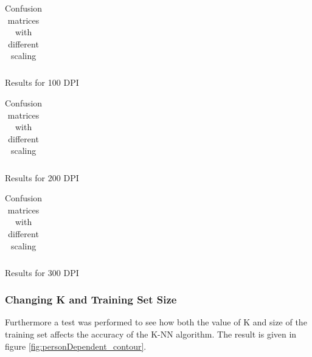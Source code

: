 \begin{table}
    \centering
    \begin{subtable}{0.5\textwidth}
        \flushright
    \end{subtable}

    \begin{subtable}{0.1\textwidth}
        \flushright
    \end{subtable}
    \begin{subtable}{0.6\textwidth}
        \begin{subtable}{\textwidth}
            \centering
            {\tiny
                \begin{tabular}{l|*{10}{c}}
                    
                \end{tabular}
            }
            \caption{Results for 100 DPI}
        \end{subtable}
        \begin{subtable}{\textwidth}
            \centering
            {\tiny
                \begin{tabular}{l|*{10}{c}}
                    
                \end{tabular}
            }
            \caption{Results for 200 DPI}
        \end{subtable}
        \begin{subtable}{\textwidth}
            \centering
            {\tiny
                \begin{tabular}{l|*{10}{c}}
                    
                \end{tabular}
            }
            \caption{Results for 300 DPI}
        \end{subtable}
    \end{subtable}
    \caption{Confusion matrices with different scaling}
    \label{tb:confus}
\end{table}

\subsubsection{Changing K and Training Set Size}
Furthermore a test was performed to see how both the value of K and size of the training set affects the accuracy of the K-NN algorithm. The result is given in figure \ref{fig:personDependent_contour}.

